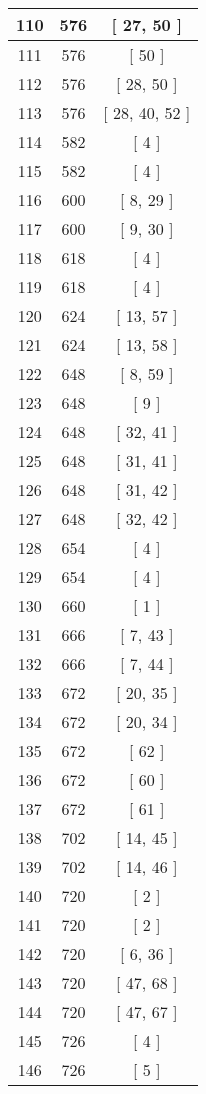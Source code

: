 \begin{center}
\begin{longtable}[H]{|| c c c ||}
\hline
110 & 576 & [ 27, 50 ] \\ 
\hline
111 & 576 & [ 50 ] \\ 
\hline
112 & 576 & [ 28, 50 ] \\ 
\hline
113 & 576 & [ 28, 40, 52 ] \\ 
\hline
114 & 582 & [ 4 ] \\ 
\hline
115 & 582 & [ 4 ] \\ 
\hline
116 & 600 & [ 8, 29 ] \\ 
\hline
117 & 600 & [ 9, 30 ] \\ 
\hline
118 & 618 & [ 4 ] \\ 
\hline
119 & 618 & [ 4 ] \\ 
\hline
120 & 624 & [ 13, 57 ] \\ 
\hline
121 & 624 & [ 13, 58 ] \\ 
\hline
122 & 648 & [ 8, 59 ] \\ 
\hline
123 & 648 & [ 9 ] \\ 
\hline
124 & 648 & [ 32, 41 ] \\ 
\hline
125 & 648 & [ 31, 41 ] \\ 
\hline
126 & 648 & [ 31, 42 ] \\ 
\hline
127 & 648 & [ 32, 42 ] \\ 
\hline
128 & 654 & [ 4 ] \\ 
\hline
129 & 654 & [ 4 ] \\ 
\hline
130 & 660 & [ 1 ] \\ 
\hline
131 & 666 & [ 7, 43 ] \\ 
\hline
132 & 666 & [ 7, 44 ] \\ 
\hline
133 & 672 & [ 20, 35 ] \\ 
\hline
134 & 672 & [ 20, 34 ] \\ 
\hline
135 & 672 & [ 62 ] \\ 
\hline
136 & 672 & [ 60 ] \\ 
\hline
137 & 672 & [ 61 ] \\ 
\hline
138 & 702 & [ 14, 45 ] \\ 
\hline
139 & 702 & [ 14, 46 ] \\ 
\hline
140 & 720 & [ 2 ] \\ 
\hline
141 & 720 & [ 2 ] \\ 
\hline
142 & 720 & [ 6, 36 ] \\ 
\hline
143 & 720 & [ 47, 68 ] \\ 
\hline
144 & 720 & [ 47, 67 ] \\ 
\hline
145 & 726 & [ 4 ] \\ 
\hline
146 & 726 & [ 5 ] \\ 

\end{longtable}
\end{center}
